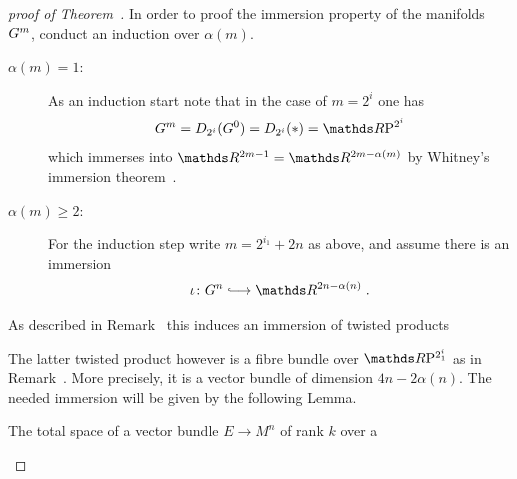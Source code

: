   \begin{proof}[proof of
    Theorem~]
    In order to proof the immersion property of the manifolds $G^{m}$,
    conduct an induction over $\alpha(m)$.
    \begin{description}
    \item[$\alpha(m)=1$:]
      As an induction start note that in the case of $m=2^i$ one has
      \begin{gather*}
        \G m
        =\Twistedprod{2^i}{\G 0}
        =\Twistedprod{2^i}{\pt}
        =\RP{2^i}
      \end{gather*}
      which immerses into $\R^{2m-1}=\R^{2m-\alpha(m)}$ by
      Whitney's immersion theorem~\cite{whitneyimmersiontheorem}.
    \item[$\alpha(m)\geq2$:]
      For the induction step write $m=2^{i_1}+2n$ as above, and assume
      there is an immersion
      \begin{gather*}
        \iota\colon\G n \immlongto \R^{2n-\alpha(n)}
        \;.
      \end{gather*}
    \end{description}
    As described in
    Remark~
    this induces an immersion of twisted products
    \begin{center}
    \end{center}
    The latter twisted product however is a fibre bundle over
    $\RP{2^i_1}$ as in
    Remark~.
    More precisely, it is a vector bundle of dimension $4n-2\alpha(n)$.
    The needed immersion will be given by the following Lemma.
    \begin{Lem}\label{lem:immersionvbtotalspaces}
      The total space of a vector bundle $E\to M^n$ of rank $k$ over a

\end{Lem}
\end{proof}
